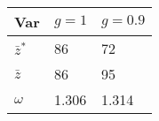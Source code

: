 \begin{tabular}{@{}lll@{}}
\toprule
Var         & $g=1$ & $g=0.9$ \\ \midrule
$\bar{z}^*$ & 86    & 72      \\
$\bar{z}$   & 86    & 95      \\
$\omega$    & 1.306 & 1.314   \\ \bottomrule
\end{tabular}
